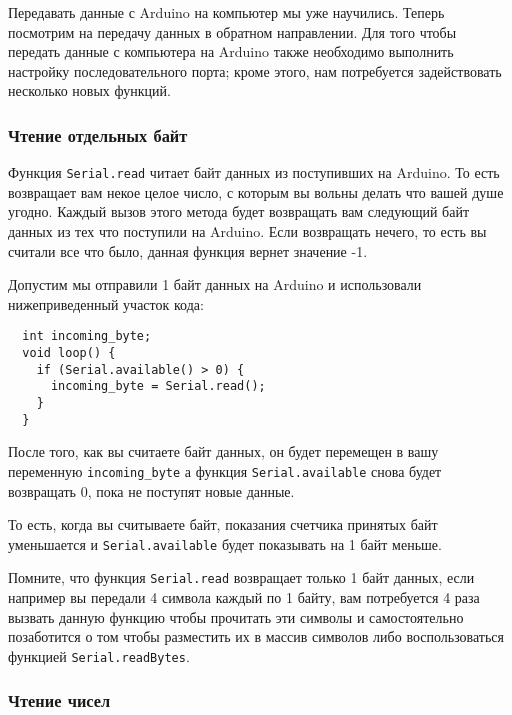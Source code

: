 \documentclass[../sparc.tex]{subfiles}
\begin{document}
Передавать данные с Arduino на компьютер мы уже научились. Теперь посмотрим на
передачу данных в обратном направлении.  Для того чтобы передать данные с
компьютера на Arduino также необходимо выполнить настройку последовательного
порта; кроме этого, нам потребуется задействовать несколько новых функций.

\subsubsection{Чтение отдельных байт}

Функция \texttt{Serial.read} читает байт данных из поступивших на Arduino.  То
есть возвращает вам некое целое число, с которым вы вольны делать что вашей душе
угодно. Каждый вызов этого метода будет возвращать вам следующий байт данных из
тех что поступили на Arduino.  Если возвращать нечего, то есть вы считали все что
было, данная функция вернет значение -1.


Допустим мы отправили 1 байт данных на Arduino и использовали нижеприведенный
участок кода:

\begin{verbatim}
  int incoming_byte;
  void loop() {
    if (Serial.available() > 0) {
      incoming_byte = Serial.read();
    }
  }
\end{verbatim}

После того, как вы считаете байт данных, он будет перемещен в вашу переменную
\texttt{incoming\_byte} а функция \texttt{Serial.available} снова будет
возвращать 0, пока не поступят новые данные.

То есть, когда вы считываете байт, показания счетчика принятых байт уменьшается
и \texttt{Serial.available} будет показывать на 1 байт меньше.

Помните, что функция \texttt{Serial.read} возвращает только 1 байт данных, если
например вы передали 4 символа каждый по 1 байту, вам потребуется 4 раза вызвать
данную функцию чтобы прочитать эти символы и самостоятельно позаботится о том
чтобы разместить их в массив символов либо воспользоваться функцией
\texttt{Serial.readBytes}.

\subsubsection{Чтение чисел}
\end{document}

